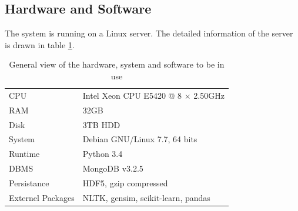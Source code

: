 \bigbreak

\clearpage

\subsection{Hardware and Software}
\label{sec:4.6}

The system is running on a Linux server. The detailed information of the server is drawn in table \ref{tab:pcinfo}.

\begin{table}[!htb]
\begin{tabular}{ll}
CPU & Intel Xeon CPU E5420 @ 8 $\times$ 2.50GHz \\
RAM & 32GB \\ 
Disk & 3TB HDD \\ 
System & Debian GNU/Linux 7.7, 64 bits \\ 
Runtime & Python 3.4 \\
DBMS & MongoDB v3.2.5\\ 
Persistance & HDF5, gzip compressed \\
Externel Packages & NLTK, gensim, scikit-learn, pandas \\
\end{tabular}
\caption{General view of the hardware, system and software to be in use}
\label{tab:pcinfo}
\end{table}
